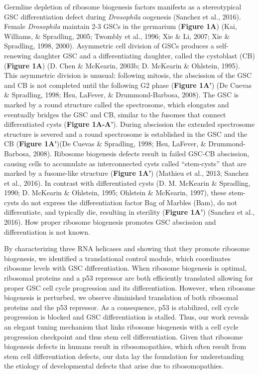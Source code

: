 \documentclass[12pt,oneside]{reedthesis}
\begin{document}
Germline depletion of ribosome biogenesis factors manifests as a stereotypical GSC differentiation defect during \emph{Drosophila} oogenesis (Sanchez et al., 2016). Female \emph{Drosophila} maintain 2-3 GSCs in the germarium (\textbf{Figure 1A}) (Kai, Williams, \& Spradling, 2005; Twombly et al., 1996; Xie \& Li, 2007; Xie \& Spradling, 1998, 2000). Asymmetric cell division of GSCs produces a self-renewing daughter GSC and a differentiating daughter, called the cystoblast (CB) (\textbf{Figure 1A}) (D. Chen \& McKearin, 2003b; D. McKearin \& Ohlstein, 1995). This asymmetric division is unusual: following mitosis, the abscission of the GSC and CB is not completed until the following G2 phase (\textbf{Figure 1A'}) (De Cuevas \& Spradling, 1998; Hsu, LaFever, \& Drummond-Barbosa, 2008). The GSC is marked by a round structure called the spectrosome, which elongates and eventually bridges the GSC and CB, similar to the fusomes that connect differentiated cysts (\textbf{Figure 1A-A'}). During abscission the extended spectrosome structure is severed and a round spectrosome is established in the GSC and the CB (\textbf{Figure 1A'})(De Cuevas \& Spradling, 1998; Hsu, LaFever, \& Drummond-Barbosa, 2008). Ribosome biogenesis defects result in failed GSC-CB abscission, causing cells to accumulate as interconnected cysts called ``stem-cysts'' that are marked by a fusome-like structure (\textbf{Figure 1A'}) (Mathieu et al., 2013; Sanchez et al., 2016). In contrast with differentiated cysts (D. M. McKearin \& Spradling, 1990; D. McKearin \& Ohlstein, 1995; Ohlstein \& McKearin, 1997), these stem-cysts do not express the differentiation factor Bag of Marbles (Bam), do not differentiate, and typically die, resulting in sterility (\textbf{Figure 1A'}) (Sanchez et al., 2016). How proper ribosome biogenesis promotes GSC abscission and differentiation is not known.

By characterizing three RNA helicases and showing that they promote ribosome biogenesis, we identified a translational control module, which coordinates ribosome levels with GSC differentiation. When ribosome biogenesis is optimal, ribosomal proteins and a p53 repressor are both efficiently translated allowing for proper GSC cell cycle progression and its differentiation. However, when ribosome biogenesis is perturbed, we observe diminished translation of both ribosomal proteins and the p53 repressor. As a consequence, p53 is stabilized, cell cycle progression is blocked and GSC differentiation is stalled. Thus, our work reveals an elegant tuning mechanism that links ribosome biogenesis with a cell cycle progression checkpoint and thus stem cell differentiation. Given that ribosome biogenesis defects in humans result in ribosomopathies, which often result from stem cell differentiation defects, our data lay the foundation for understanding the etiology of developmental defects that arise due to ribosomopathies.
\end{document}
